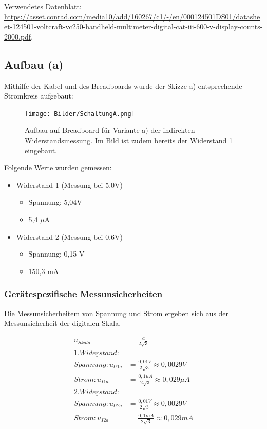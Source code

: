 \documentclass[class=article, crop=false]{standalone}
\begin{document}
Verwendetes Datenblatt:
\url{https://asset.conrad.com/media10/add/160267/c1/-/en/000124501DS01/datasheet-124501-voltcraft-vc250-handheld-multimeter-digital-cat-iii-600-v-display-counts-2000.pdf}.

\hypertarget{aufbau-a}{%
\subsection{Aufbau (a)}\label{aufbau-a}}

Mithilfe der Kabel und des Breadboards wurde der Skizze a) entsprechende
Stromkreis aufgebaut:

\begin{figure}
\centering
\texttt{[image: Bilder/SchaltungA.png]}
\caption{Aufbau auf Breadboard für Variante a) der indirekten
Widerstandsmessung. Im Bild ist zudem bereits der Widerstand 1
eingebaut.}
\end{figure}

\newpage

Folgende Werte wurden gemessen:

\begin{itemize}
\item {Widerstand 1 (Messung bei 5,0V)}
\begin{itemize}
\item {Spannung: 5,04V}
\item {5,4 $\mu$A}
\end{itemize}
\item {Widerstand 2 (Messung bei 0,6V)}
\begin{itemize}
\item {Spannung: 0,15 V}
\item {150,3 mA}
\end{itemize}
\end{itemize}

\hypertarget{geruxe4tespezifische-messunsicherheiten}{%
\subsubsection{Gerätespezifische
Messunsicherheiten}\label{geruxe4tespezifische-messunsicherheiten}}

Die Messunsicherheitem von Spannung und Strom ergeben sich aus der
Messunsicherheit der digitalen Skala.

\begin{equation*}
\begin{split}
u_{Skala} &=\frac{a}{2\sqrt{3}} \\
\underline{1.Widerstand:} \\
Spannung: u_{U1a} &= \frac{0,01V}{2\sqrt{3}} \approx 0,0029 V \\
Strom: u_{I1a} &= \frac{0,1\mu A}{2\sqrt{3}} \approx 0,029\mu A \\
\underline{2.Widerstand:} \\
Spannung: u_{U2a} &= \frac{0,01V}{2\sqrt{3}} \approx 0,0029 V \\
Strom: u_{I2a} &= \frac{0,1mA}{2\sqrt{3}} \approx 0,029 mA \\
\end{split}
\end{equation*}
\end{document}
